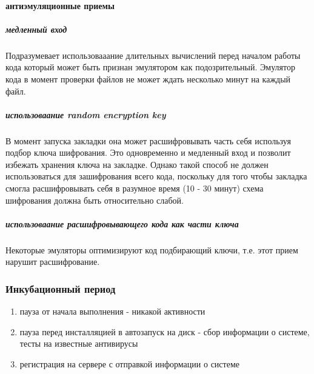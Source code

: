 \paragraph{антиэмуляционные приемы\\}

\subparagraph{медленный вход\\}
Подразумевает использовааание длительных вычислений перед началом работы кода который может быть признан эмулятором как подозрительный. Эмулятор кода в момент проверки файлов не может ждать несколько минут на каждый файл.

\subparagraph{использоваание random encryption key\\}
\label{random_enc_key}
В момент запуска закладки она может расшифровывать часть себя используя подбор ключа шифрования. Это одновременно и медленный вход и позволит избежать хранения ключа на закладке. Однако такой способ не должен использоваться для зашифрования всего кода, поскольку для того чтобы закладка смогла расшифровывать себя в разумное время (10 - 30 минут) схема шифрования должна быть относительно слабой.

\subparagraph{использоваание расшифровывающего кода как части ключа\\}
\label{decryptor_as_a_part_of_key}
Некоторые эмуляторы оптимизируют код подбирающий ключи, т.е. этот прием нарушит расшифрование.



%


\subsubsection{Инкубационный период}
\begin{enumerate}
 \item {пауза от начала выполнения - никакой активности }
 \item {пауза перед инсталляцией в автозапуск на диск - сбор информации о системе,
тесты на известные антивирусы}
 \item {регистрация на сервере с отправкой информации о системе}
\end{enumerate}
